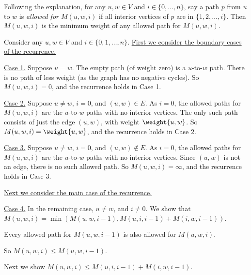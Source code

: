 \begin{longFormProof}
  \step Following the explanation, for any $u,w\in V$ and $i\in\{0,\ldots,n\}$,
  say a path $p$ from $u$ to $w$ is \emph{allowed for $M(u, w, i)$}
  if all interior vertices of $p$ are in $\{1,2,\ldots, i\}$.
  Then $M(u, w, i)$ is the minimum weight of any allowed path for $M(u, w, i)$.
  \begin{block}[dp: uwi]
    \step Consider any $u, w\in V$ and $i\in\{0,1,\ldots,n\}$.
    \step \underline{First we consider the boundary cases of the recurrence.}
    \begin{block}[dp: u equal w]
      \step \underline{Case 1.}
      Suppose $u=w$.
      \step The empty path (of weight zero) is a $u$-to-$w$ path.
      \step There is no path of less weight (as the graph has no negative cycles).
      \step So $M(u, w, i) = 0$, and the recurrence holds in Case 1.
    \end{block}
    \smallskip 
    \begin{block}
      \step \underline{Case 2.}
      Suppose $u\ne w$, $i=0$, and $(u,w)\in E$.
      \step As $i=0$, the allowed paths for $M(u, w, i)$ are the $u$-to-$w$ paths
      with no interior vertices.
      \step
      The only such path consists of just the edge $(u,w)$,
      with weight $\weight{u,w}$.
      \step
      So $M(u, w, i) = \weight{u,w}$, and the recurrence holds in Case 2.
    \end{block}
    \smallskip 
    \begin{block}
      \step \underline{Case 3.}
      Suppose $u\ne w$, $i=0$, and $(u,w)\not\in E$.
      \step As $i=0$, the allowed paths for $M(u, w, i)$ are the $u$-to-$w$ paths
      with no interior vertices.
      \step
      Since $(u,w)$ is not an edge, there is no such allowed path.
      \step
      So $M(u, w, i) = \infty$, and the recurrence holds in Case 3.
    \end{block}
    \smallskip 
    \step \underline{Next we consider the main case of the recurrence.}
    \begin{block}[dp: main]
      \step \underline{Case 4.}
      In the remaining case, $u\ne w$, and  $i\ne 0$.
      \step We show that $M(u,w,i) = \min( M(u, w, i-1), M(u, i, i-1) + M(i, w, i-1) )$.

      \step Every allowed path for $M(u, w, i-1)$ is also allowed for $M(u, w, i)$.

      \step[dp: A] So $M(u,w,i) \le M(u,w,i-1)$.

      \step Next we show $M(u, w, i) \le M(u, i, i-1) + M(i, w, i-1)$.
      

\end{block}
\end{block}
\end{longFormProof}

